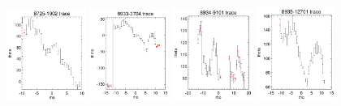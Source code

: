 \documentclass[fleqn,usenatbib]{mnras}
\begin{document}
\begin{figure}
    \includegraphics[width=0.23\textwidth]{Images/SN1-MC250/CPSBs/8725-1902-1-250.png}
    \includegraphics[width=0.23\textwidth]{Images/SN1-MC250/CPSBs/8933-3704-1-250.png}
    \includegraphics[width=0.23\textwidth]{Images/SN1-MC250/CPSBs/8934-9101-1-250.png}
    \includegraphics[width=0.23\textwidth]{Images/SN1-MC250/CPSBs/8935-12701-1-250.png}    
    \caption{}
    \label{fig:Radon-traces-CPSB-controls-1-SN1-MC250}
\end{figure}
\end{document}
